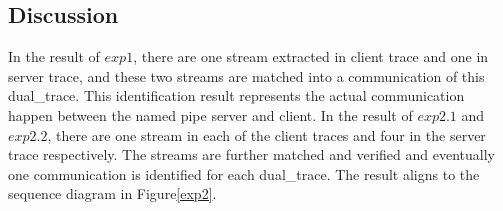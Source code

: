 \subsection{Discussion}
In the result of $exp1$, there are one stream extracted in client trace and one in server trace, and these two streams are matched into a communication of this dual\_trace. This identification result represents the actual communication happen between the named pipe server and client.
In the result of $exp2.1$ and $exp2.2$, there are one stream in each of the client traces and four in the server trace respectively. The streams are further matched and verified and eventually one communication is identified for each dual\_trace. The result aligns to the sequence diagram in Figure\ref{exp2}.


   




